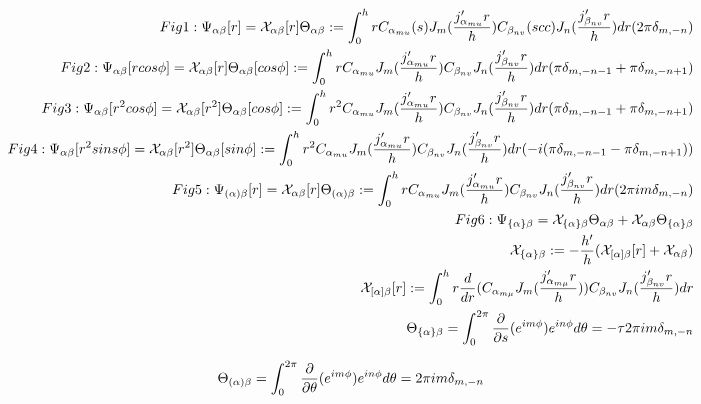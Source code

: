 \documentclass{Note}
\begin{document}
\begin{equation}
\begin{aligned}
Fig1:\Psi_{\alpha\beta}[r]=\mathcal{X}_{\alpha\beta}[r]\Theta_{\alpha\beta}:= \int_0^h r C_{\alpha_{mu}}(s) J_m({j'_{\alpha_{mu}}r\over h})  C_{\beta_{nv}} (scc)J_n({j'_{\beta_{nv}}r\over h})dr (2\pi \delta_{m,-n})\\
Fig2:  \Psi_{\alpha\beta}[rcos\phi]=\mathcal{X}_{\alpha\beta}[r]\Theta_{\alpha\beta}[cos\phi]:=
\int_0^h r C_{\alpha_{mu}} J_m({j'_{\alpha_{mu}}r\over h})  C_{\beta_{nv}} J_n({j'_{\beta_{nv}}r\over h})dr (\pi \delta_{m,-n-1}+\pi \delta_{m,-n+1})\\
 Fig3:  \Psi_{\alpha\beta}[r^2cos\phi]=\mathcal{X}_{\alpha\beta}[r^2]\Theta_{\alpha\beta}[cos\phi]:=
\int_0^h r^2 C_{\alpha_{mu}} J_m({j'_{\alpha_{mu}}r\over h})  C_{\beta_{nv}} J_n({j'_{\beta_{nv}}r\over h})dr  (\pi \delta_{m,-n-1}+\pi \delta_{m,-n+1})\\
 Fig4:  \Psi_{\alpha\beta}[r^2sins\phi]=\mathcal{X}_{\alpha\beta}[r^2]\Theta_{\alpha\beta}[sin\phi]:=
 \int_0^h r^2 C_{\alpha_{mu}} J_m({j'_{\alpha_{mu}}r\over h})  C_{\beta_{nv}} J_n({j'_{\beta_{nv}}r\over h})dr (-i(\pi \delta_{m,-n-1}-\pi \delta_{m,-n+1}))\\
  Fig5:  \Psi_{(\alpha)\beta}[r]=\mathcal{X}_{\alpha\beta}[r]\Theta_{(\alpha)\beta}:=
\int_0^h r C_{\alpha_{mu}} J_m({j'_{\alpha_{mu}}r\over h})  C_{\beta_{nv}} J_n({j'_{\beta_{nv}}r\over h})dr  (2\pi im \delta_{m,-n})\\
 Fig6:  \Psi_{\{\alpha\}\beta}=\mathcal{X}_{\{\alpha\}\beta}\Theta_{\alpha\beta}+\mathcal{X}_{\alpha\beta}\Theta_{\{\alpha\}\beta}\\
 \mathcal{X}_{\{\alpha\}\beta}:=-{h'\over h}(\mathcal{X}_{[\alpha]\beta}[r]+\mathcal{X}_{\alpha\beta})\\
 \mathcal{X}_{[\alpha]\beta}[r]:=\int_0^h r {d\over dr}(C_{\alpha_{m\mu}} J_m({j'_{\alpha_{m\mu}}r\over h}))C_{\beta_{nv}} J_n({j'_{\beta_{nv}}r\over h})dr\\
\Theta_{\{\alpha\}\beta}=\int_0^{2\pi} {\partial \over \partial s}(e^{im\phi}) e^{in\phi} d\theta
=-\tau 2\pi   im \delta_{m,-n}
\end{aligned}
\end{equation}


\begin{equation}
\begin{aligned}
\Theta_{(\alpha)\beta}=\int_0^{2\pi} {\partial \over \partial \theta}(e^{im\phi}) e^{in\phi} d\theta
=2\pi im \delta_{m,-n}
\end{aligned}
\end{equation}
\end{document}
